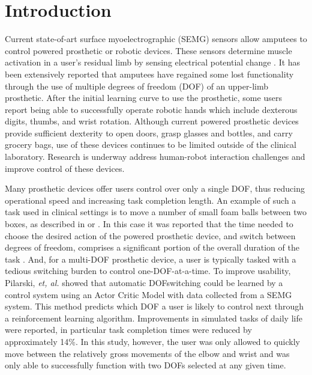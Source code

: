 \documentclass[twocolumn]{sagej}
\begin{document}

\maketitle

\section{Introduction}

Current state-of-art surface myoelectrographic (SEMG) sensors allow amputees to control powered prosthetic or robotic devices.  These sensors determine muscle activation  in a user's residual limb by sensing electrical potential change \cite{Hargrove2007c}.  It has been extensively reported that amputees have regained some lost functionality through the use of  multiple degrees of freedom (DOF) of an upper-limb prosthetic\cite{Dalley02013}.  After the initial learning curve to use the prosthetic, some users report being able to successfully  operate robotic hands which include  dexterous digits, thumbs, and wrist rotation. Although current powered prosthetic devices provide sufficient dexterity to open doors, grasp  glasses  and bottles, and carry grocery  bags\cite{Belter2013}, use of these devices continues  to be limited outside  of the clinical laboratory.  Research is underway  address human-robot  interaction   challenges and improve control of these devices.\par \noindent
Many prosthetic  devices  offer users  control over only a single DOF, thus reducing operational   speed  and increasing task completion length. An example of such a task used in clinical settings is to move  a number  of small foam balls between two boxes,  as described  in \cite{Dalley02013}\cite{Dawson2012} or \cite{Mathiowetz1985}.  In this case it was reported that  the time needed  to choose  the desired  action of the powered prosthetic device, and switch between degrees of freedom, comprises a significant  portion of the overall duration of the task \cite{Pilarski2012}.  And, for a multi-DOF  prosthetic device,  a user is typically tasked with a tedious switching burden to control one-DOF-at-a-time. To improve usability, Pilarski, \textit{et, al.}\cite{Pilarski2012} showed that automatic DOFswitching could be learned by a control  system using an Actor Critic Model with data collected from a SEMG system.  This method predicts which DOF a user is likely to control next through a reinforcement learning algorithm. Improvements in simulated tasks of daily life were reported, in particular task completion times were reduced by approximately 14\%\cite{Pilarski2012}.  In this study, however, the user was only allowed  to quickly move  between  the relatively gross movements  of the elbow and wrist and was only able to successfully function with two DOFs selected at any given time.  \par \noindent  
\end{document}
